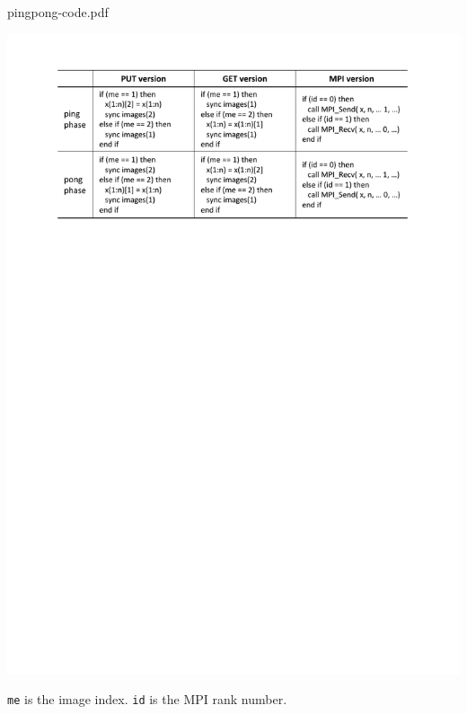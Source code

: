 \begin{table}[bht]
  \begin{center}
    \caption{pingpong-code.pdf}\label{tab:pingpong-code}
    \mbox{\includegraphics[trim=24mm 211mm 24mm 16mm, scale=0.7,clip]{figs/pingpong-code-r2.pdf}}
    \begin{flushright}
      {\tt me} is the image index. {\tt id} is the MPI rank number.
    \end{flushright}
  \end{center}
\end{table}

